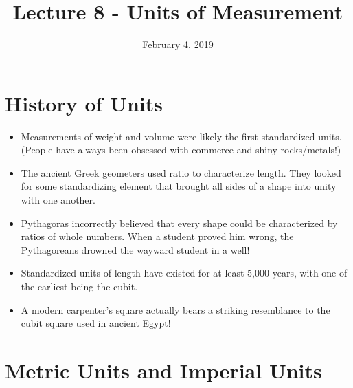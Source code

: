 \documentclass{article}
\title{Lecture 8 - Units of Measurement}
\author{}
\date{February 4, 2019}
\begin{document}
\maketitle

\section*{History of Units}
\begin{itemize}
\item Measurements of weight and volume were likely the first standardized units.  (People have always been obsessed with commerce and shiny rocks/metals!)
\item The ancient Greek geometers used ratio to characterize length.  They looked for some standardizing element that brought all sides of a shape into unity with one another.
\item Pythagoras incorrectly believed that every shape could be characterized by ratios of whole numbers.  When a student proved him wrong, the Pythagoreans drowned the wayward student in a well!
\item Standardized units of length have existed for at least 5,000 years, with one of the earliest being the cubit.
\item A modern carpenter's square actually bears a striking resemblance to the cubit square used in ancient Egypt!
\end{itemize}

\section*{Metric Units and Imperial Units}
\end{document}
